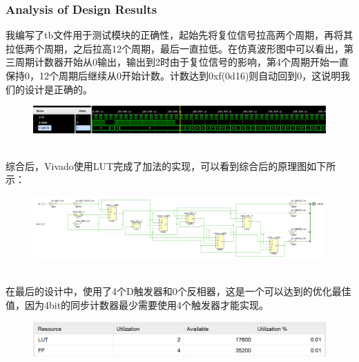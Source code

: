 \documentclass[11pt, a4 paper]{article}
\begin{document}
\subsubsection{Analysis of Design Results}
我编写了tb文件用于测试模块的正确性，起始先将复位信号拉高两个周期，再将其拉低两个周期，之后拉高12个周期，最后一直拉低。在仿真波形图中可以看出，第三周期计数器开始从0输出，输出到2时由于复位信号的影响，第4个周期开始一直保持0，12个周期后继续从0开始计数。计数达到0xf(0d16)则自动回到0，这说明我们的设计是正确的。
\begin{figure}[h]
    \centering
    \includegraphics[width=1\linewidth]{image/problem1_result0.png}
\end{figure}
\\综合后，Vivado使用LUT完成了加法的实现，可以看到综合后的原理图如下所示：
\begin{figure}[h]
    \centering
    \includegraphics[width=1\linewidth]{image/counter1.png}
\end{figure}
\\在最后的设计中，使用了4个D触发器和0个反相器，这是一个可以达到的优化最佳值，因为4bit的同步计数器最少需要使用4个触发器才能实现。
\begin{figure}[h]
    \centering
    \includegraphics[width=1\linewidth]{image/problem1_result1.png}
\end{figure}
\end{document}
